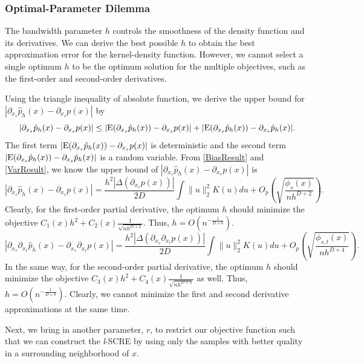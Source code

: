 \documentclass[aos,preprint]{imsart}
\theoremstyle{remark}
\begin{document}
\subsubsection{Optimal-Parameter Dilemma}
The bandwidth parameter $h$ controls the smoothness of the density function and its derivatives. We can derive the best possible $h$ to obtain the best approximation error for the kernel-density function. However, we cannot select a single optimum $h$ to be the optimum solution for the multiple objectives, such as the first-order and second-order derivatives.

Using the triangle inequality of absolute function, we derive the upper bound for  $|\partial_{x_s} \hat{p}_h(x) - \partial_{x_s} p(x)|$ by
\[
|\partial_{x_s} \hat{p}_h(x) - \partial_{x_s} p(x)|\leq |{\rm E}(\partial_{x_s}  \hat{p}_h(x)) - \partial_{x_s}p(x)|+ |{\rm E}  (\partial_{x_s} \hat{p}_h(x)) -\partial_{x_s}\hat{p}_h(x)| .
\]
The first term $|{\rm E}(\partial_{x_s}  \hat{p}_h(x)) - \partial_{x_s}p(x)|$ is deterministic and the second term $|{\rm E}  (\partial_{x_s} \hat{p}_h(x)) -\partial_{x_s}\hat{p}_h(x)|$ is a random variable. From \eqref{BiasResult} and \eqref{VarResult}, we know the upper bound of $|\partial_{x_s} \hat{p}_h(x) - \partial_{x_s} p(x)| $ is
\[
|\partial_{x_s} \hat{p}_h(x) - \partial_{x_s} p(x)| =  \frac{h^2|\Delta (\partial_{x_s}p(x))|}{2D}  \int \|u\|_2^2 K(u) du +O_p( \sqrt{\frac{\phi_s(x)}{n h^{D+2}} } ).
\]
Clearly, for the first-order partial derivative, the optimum $h$ should minimize the objective $C_1(x)h^2+C_2(x)\frac{1}{\sqrt{n h^{D+2}}}$. Thus, $h = O({n^{-\frac{1}{D+6}}})$.
\[
|\partial_{x_s}\partial_{x_t} \hat{p}_h(x) - \partial_{x_s}\partial_{x_t} p(x)| = \frac{h^2 |\Delta (\partial_{x_s}\partial_{x_t} p(x))|}{2D} \int \|u\|_2^2 K(u) du + O_p(\sqrt{\frac{\phi_{s,t}(x)}{nh^{D+4}}}).
\]
In the same way, for the second-order partial derivative, the optimum $h$ should minimize the objective $C_3(x)h^2+C_4(x)\frac{1}{\sqrt{n h^{D+4}}}$ as well. Thus, $h = O(n^{-\frac{1}{D+8}})$. Clearly, we cannot minimize the first and second derivative approximations at the same time.

Next, we bring in another parameter, $r$, to restrict our objective function such that we can construct the {\it l}-SCRE by using only the samples with better quality in a surrounding neighborhood of $x$.
\end{document}
